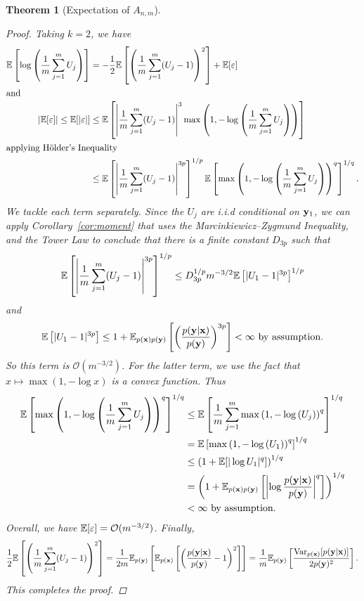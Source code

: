 \documentclass[a4paper, 10pt]{report}
\theoremstyle{plain}
\newtheorem{theorem}{Theorem}[chapter]
\begin{document}
\begin{theorem}[Expectation of $A_{n,m}$]
\begin{proof}
			Taking $k=2$, we have
			\begin{align}
			\mathbb{E}\left[ \log\left( \frac{1}{m} \sum_{j=1}^m U_j \right) \right] &= -\frac{1}{2} \mathbb{E}\left[\left(\frac{1}{m}\sum_{j=1}^m (U_j -1) \right)^2 \right] + \mathbb{E}[\varepsilon]\\
			\intertext{and}
			\left|\mathbb{E}[\varepsilon]\right| \le \mathbb{E}[|\varepsilon|] &\le \mathbb{E}\left[ \left| \frac{1}{m}\sum_{j=1}^m (U_j -1) \right|^3 \max\left(1, -\log\left( \frac{1}{m} \sum_{j=1}^m U_j \right) \right)  \right]\\
			\intertext{applying H\"{o}lder's Inequality} 
			&\le \mathbb{E}\left[ \left| \frac{1}{m}\sum_{j=1}^m (U_j -1) \right|^{3p} \right]^{1/p}\mathbb{E}\left[ \max\left(1, -\log\left( \frac{1}{m} \sum_{j=1}^m U_j \right) \right)^q  \right]^{1/q}.
			\end{align}
			We tackle each term separately. 
			Since the $U_j$ are i.i.d conditional on ${\mathbf{y}}_1$, we can apply Corollary~\ref{cor:moment} that uses the Marcinkiewicz--Zygmund Inequality, and the Tower Law to conclude that there is a finite constant $D_{3p}$ such that
			\begin{equation}
			\mathbb{E}\left[ \left| \frac{1}{m}\sum_{j=1}^m (U_j -1) \right|^{3p} \right]^{1/p} \le D_{3p}^{1/p}m^{-3/2}\mathbb{E}\left[ |U_1 - 1|^{3p} \right]^{1/p}
			\end{equation}
			and
			\begin{equation}
			\mathbb{E}\left[ |U_1 - 1|^{3p} \right] \le 1 + \mathbb{E}_{p({\mathbf{x}})p({\mathbf{y}})}\left[\left(\frac{p({\mathbf{y}}|{\mathbf{x}})}{p({\mathbf{y}})}\right)^{3p} \right] < \infty \text{ by assumption.}
			\end{equation}
			So this term is $\mathcal{O}(m^{-3/2})$.
			For the latter term, we use the fact that $x \mapsto \max(1, -\log x)$ is a convex function. Thus
			\begin{align}
			\mathbb{E}\left[ \max\left(1, -\log\left( \frac{1}{m} \sum_{j=1}^m U_j \right) \right)^q  \right]^{1/q} &\le \mathbb{E}\left[\frac{1}{m} \sum_{j=1}^m \max\left(1, -\log\left(  U_j \right) \right)^q  \right]^{1/q} \\
			&= \mathbb{E}\left[ \max\left(1, -\log\left(  U_1 \right) \right)^q  \right]^{1/q} \\
			&\le \left(1 + \mathbb{E}[|\log U_1|^q] \right)^{1/q} \\
			&= \left(1 + \mathbb{E}_{p({\mathbf{x}})p({\mathbf{y}})}\left[\left|\log \frac{p({\mathbf{y}}|{\mathbf{x}})}{p({\mathbf{y}})}\right|^q\right] \right)^{1/q}\\
			&<\infty \text{ by assumption.}
			\end{align}
			Overall, we have $\mathbb{E}[\varepsilon] = \mathcal{O}(m^{-3/2})$.
			Finally, 
			\begin{equation}
			\frac{1}{2}\mathbb{E}\left[\left(\frac{1}{m}\sum_{j=1}^m (U_j -1) \right)^2 \right] = \frac{1}{2m}\mathbb{E}_{p({\mathbf{y}})}\left[ \mathbb{E}_{p({\mathbf{x}})}\left[ \left( \frac{p({\mathbf{y}}|{\mathbf{x}})}{p({\mathbf{y}})} - 1 \right)^2 \right] \right] = \frac{1}{m}\mathbb{E}_{p({\mathbf{y}})}\left[\frac{\mathrm{Var}_{p({\mathbf{x}})}[p({\mathbf{y}}|{\mathbf{x}})]}{2p({\mathbf{y}})^2} \right].
			\end{equation}
			This completes the proof.
		\end{proof}
	\end{theorem}
\end{document}
